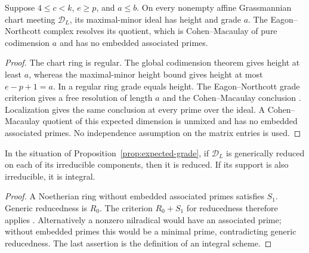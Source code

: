 \begin{proposition}
\label{prop:expected-grade}
Suppose $4\le c<k$, $e\ge p$, and $a\le b$. On every nonempty affine
Grassmannian chart meeting $\mathscr D_L$, its maximal-minor ideal has
height and grade $a$. The Eagon--Northcott complex resolves its quotient,
which is Cohen--Macaulay of pure codimension $a$ and has no embedded
associated primes.
\end{proposition}
\begin{proof}
The chart ring is regular. The global codimension theorem gives height
at least $a$, whereas the maximal-minor height bound gives height at most
$e-p+1=a$. In a regular ring grade equals height. The Eagon--Northcott
grade criterion gives a free resolution of length $a$ and the
Cohen--Macaulay conclusion \cite{EN,Kustin}. Localization gives the same
conclusion at every prime over the ideal. A Cohen--Macaulay quotient of
this expected dimension is unmixed and has no embedded associated
primes. No independence assumption on the matrix entries is used.
\end{proof}
\begin{proposition}\label{prop:generic-reducedness}
In the situation of Proposition~\ref{prop:expected-grade}, if
$\mathscr D_L$ is generically reduced on each of its irreducible
components, then it is reduced. If its support is also irreducible, it
is integral.
\end{proposition}
\begin{proof}
A Noetherian ring without embedded associated primes satisfies $S_1$.
Generic reducedness is $R_0$. The criterion $R_0+S_1$ for reducedness
therefore applies \cite[Tag 031R]{Stacks}.
Alternatively a nonzero nilradical would have an associated prime;
without embedded primes this would be a minimal prime, contradicting
generic reducedness. The last assertion is the definition of an
integral scheme.
\end{proof}
